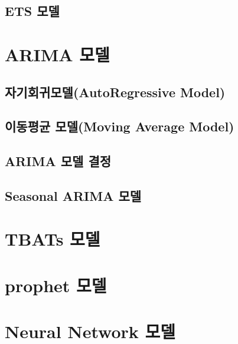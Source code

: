 \documentclass[
]{book}
\begin{document}
\hypertarget{ets-uxbaa8uxb378}{%
\subsection{ETS 모델}\label{ets-uxbaa8uxb378}}

\hypertarget{arima-uxbaa8uxb378}{%
\section{ARIMA 모델}\label{arima-uxbaa8uxb378}}

\hypertarget{uxc790uxae30uxd68cuxadc0uxbaa8uxb378autoregressive-model}{%
\subsection{자기회귀모델(AutoRegressive Model)}\label{uxc790uxae30uxd68cuxadc0uxbaa8uxb378autoregressive-model}}

\hypertarget{uxc774uxb3d9uxd3c9uxade0-uxbaa8uxb378moving-average-model}{%
\subsection{이동평균 모델(Moving Average Model)}\label{uxc774uxb3d9uxd3c9uxade0-uxbaa8uxb378moving-average-model}}

\hypertarget{arima-uxbaa8uxb378-uxacb0uxc815}{%
\subsection{ARIMA 모델 결정}\label{arima-uxbaa8uxb378-uxacb0uxc815}}

\hypertarget{seasonal-arima-uxbaa8uxb378}{%
\subsection{Seasonal ARIMA 모델}\label{seasonal-arima-uxbaa8uxb378}}

\hypertarget{tbats-uxbaa8uxb378}{%
\section{TBATs 모델}\label{tbats-uxbaa8uxb378}}

\hypertarget{prophet-uxbaa8uxb378}{%
\section{prophet 모델}\label{prophet-uxbaa8uxb378}}

\hypertarget{neural-network-uxbaa8uxb378}{%
\section{Neural Network 모델}\label{neural-network-uxbaa8uxb378}}
\end{document}

